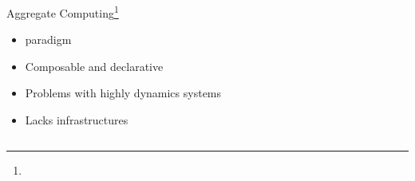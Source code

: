 \begin{frame}{Aggregate Computing\footnote[frame]{}}
  \begin{cardTiny}
    \begin{itemize}
      \item[\success{\faThumbsUp}]  paradigm
      \item[\success{\faThumbsUp}] Composable and declarative 
      \item[{\color{materialRed} \faThumbsDown}] Problems with highly dynamics systems
      \item[{\color{materialRed} \faThumbsDown}] Lacks infrastructures
    \end{itemize}
  \end{cardTiny}

  \begin{columns}
    \begin{column}{0.41\textwidth}
      \raggedright
    \end{column}
    \begin{column}{0.28\textwidth}
    \end{column}
  \end{columns}
\end{frame}